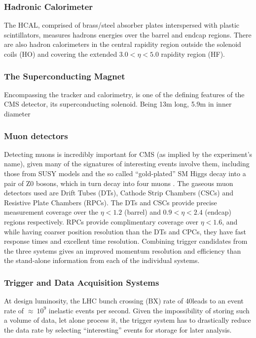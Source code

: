 \subsubsection{Hadronic Calorimeter}
The HCAL, comprised of brass/steel absorber plates interspersed with plastic scintillators, measures hadrons energies over the barrel and endcap regions. 
There are also hadron calorimeters in the central rapidity region outside the solenoid coils (HO) and covering the extended $3.0 < \eta < 5.0$ rapidity region (HF)\cite{Bayatian:2006zz}. 

\subsubsection{The Superconducting Magnet}
Encompassing the tracker and calorimetry, is one of the defining features of the CMS detector, its superconducting solenoid.
Being 13m long, 5.9m in inner diameter 
\subsubsection{Muon detectors}
Detecting muons is incredibly important for CMS (as implied by the experiment’s name), given many of the signatures of interesting events involve them, including those from SUSY models and the so called “gold-plated” SM Higgs decay into a pair of Z0 bosons, which in turn decay into four muons . 
The gaseous muon detectors used are Drift Tubes (DTs), Cathode Strip Chambers (CSCs) and Resistive Plate Chambers (RPCs). 
The DTs and CSCs provide precise measurement coverage over the $\eta < 1.2$ (barrel) and $0.9 < \eta < 2.4$ (endcap) regions respectively. 
RPCs provide complimentary coverage over $\eta < 1.6$, and while having coarser position resolution than the DTs and CPCs, they have fast response times and excellent time resolution. 
Combining trigger candidates from the three systems gives an improved momentum resolution and efficiency than the stand-alone information from each of the individual systems\cite{oldcms}. 

\subsubsection{Trigger and Data Acquisition Systems}
At design luminosity, the LHC bunch crossing (BX) rate of 40\MHz leads to an event rate of $\approx~10^{9}$ inelastic events per second.
Given the impossibility of storing such a volume of data, let alone process it, the trigger system has to drastically reduce the data rate by selecting ``interesting'' events for storage for later analysis.

